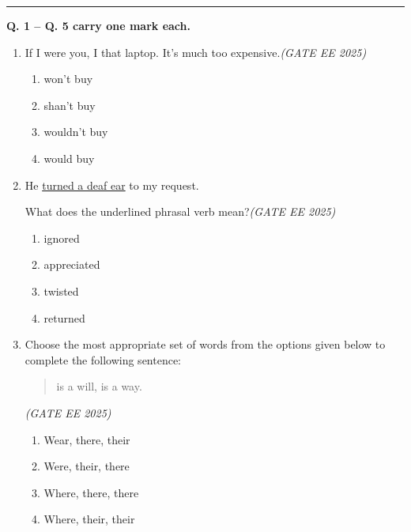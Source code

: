 



\rule{\linewidth}{0.3pt}

\textbf{Q. 1 -- Q. 5 carry one mark each.}

\begin{enumerate}[leftmargin=0pt,label=\textbf{Q.\arabic*}]
\item If I were you, I \underline{\hspace{2.5cm}} that laptop. It’s much too expensive.\hfill \textit{(GATE EE 2025)}

\begin{multicols}{2}
\begin{enumerate}[label=(\Alph*)]
\item won’t buy
\item shan’t buy
\item wouldn’t buy
\item would buy
\end{enumerate}
\end{multicols}

\vspace{1em}

\item He \underline{turned a deaf ear} to my request. 

What does the underlined phrasal verb mean?\hfill \textit{(GATE EE 2025)}

\begin{multicols}{2}
\begin{enumerate}[label=(\Alph*)]
\item ignored
\item appreciated
\item twisted
\item returned
\end{enumerate}
\end{multicols}

\vspace{1em}

\item Choose the most appropriate set of words from the options given below to complete the following sentence:

\begin{quote}
\underline{\hspace{3cm}} \quad \underline{\hspace{3cm}} \quad is a will, \quad \underline{\hspace{3cm}} \quad is a way.
\end{quote}
\hfill \textit{(GATE EE 2025)}
\begin{multicols}{2}
\begin{enumerate}[label=(\Alph*)]
\item Wear, there, their
\item Were, their, there
\item Where, there, there
\item Where, their, their
\end{enumerate}
\end{multicols}


\end{enumerate}
